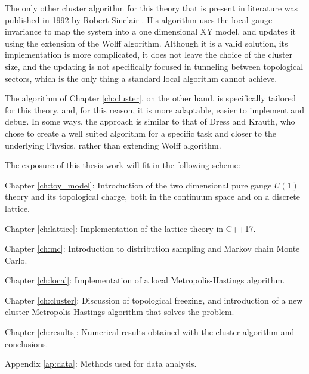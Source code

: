 The only other cluster algorithm for this theory that is present in literature was published in 1992 by Robert Sinclair \cite{sinclair:1992}.
His algorithm uses the local gauge invariance to map the system into a one dimensional XY model, and updates it using the extension of the Wolff algorithm.
Although it is a valid solution, its implementation is more complicated,
it does not leave the choice of the cluster size, and the updating is not specifically focused in tunneling between topological sectors,
which is the only thing a standard local algorithm cannot achieve. 

The algorithm of Chapter \ref{ch:cluster}, on the other hand, is specifically tailored for this theory, and,
for this reason, it is more adaptable, easier to implement and debug.
In some ways, the approach is similar to that of Dress and Krauth,
who chose to create a well suited algorithm for a specific task and closer to the underlying Physics, rather than extending Wolff algorithm.\bigskip\bigskip

\noindent
The exposure of this thesis work will fit in the following scheme:
\begin{description}
    \item{Chapter \ref{ch:toy_model}:} Introduction of the two dimensional pure gauge $U(1)$ theory and its topological charge,
    both in the continuum space and on a discrete lattice.
    \item{Chapter \ref{ch:lattice}:} Implementation of the lattice theory in C++17.
    \item{Chapter \ref{ch:mc}:} Introduction to distribution sampling and Markov chain Monte Carlo.
    \item{Chapter \ref{ch:local}:} Implementation of a local Metropolis-Hastings algorithm.
    \item{Chapter \ref{ch:cluster}:} Discussion of topological freezing, and introduction of a new cluster Metropolis-Hastings algorithm that solves the problem.
    \item{Chapter \ref{ch:results}:} Numerical results obtained with the cluster algorithm and conclusions.\\
    \item{Appendix \ref{ap:data}:} Methods used for data analysis.
\end{description}

\endgroup

\vfill

